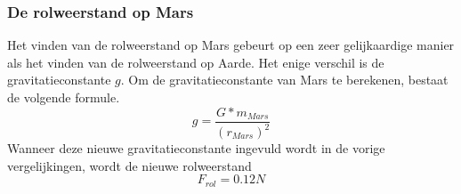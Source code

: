 \subsubsection{De rolweerstand op Mars}
Het vinden van de rolweerstand op Mars gebeurt op een zeer gelijkaardige manier als het vinden van de rolweerstand op Aarde. Het enige verschil is de gravitatieconstante $g$. Om de gravitatieconstante van Mars te berekenen, bestaat de volgende formule.
\begin{equation}
g=\frac{G*m_{Mars}}{\left(r_{Mars}\right)^2}
\end{equation}
Wanneer deze nieuwe gravitatieconstante ingevuld wordt in de vorige vergelijkingen, wordt de nieuwe rolweerstand $$F_{rol}=0.12N$$